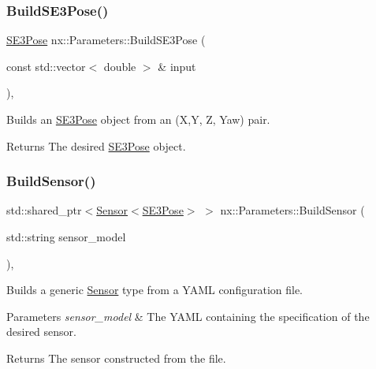 \subsubsection{\texorpdfstring{Build\+S\+E3\+Pose()}{BuildSE3Pose()}}
{\footnotesize\ttfamily \hyperlink{structnx_1_1SE3Pose}{S\+E3\+Pose} nx\+::\+Parameters\+::\+Build\+S\+E3\+Pose (\begin{DoxyParamCaption}\item[{const std\+::vector$<$ double $>$ \&}]{input }\end{DoxyParamCaption})\hspace{0.3cm}{\ttfamily [inline]}, {\ttfamily [protected]}}

Builds an \hyperlink{structnx_1_1SE3Pose}{S\+E3\+Pose} object from an (X,Y, Z, Yaw) pair. \begin{DoxyReturn}{Returns}
The desired \hyperlink{structnx_1_1SE3Pose}{S\+E3\+Pose} object. 
\end{DoxyReturn}
\mbox{\label{classnx_1_1Parameters_a60075d8f0a4b34c7f60e7cf0992ed413}} 
\subsubsection{\texorpdfstring{Build\+Sensor()}{BuildSensor()}}
{\footnotesize\ttfamily std\+::shared\+\_\+ptr$<$\hyperlink{classnx_1_1Sensor}{Sensor}$<$\hyperlink{structnx_1_1SE3Pose}{S\+E3\+Pose}$>$ $>$ nx\+::\+Parameters\+::\+Build\+Sensor (\begin{DoxyParamCaption}\item[{std\+::string}]{sensor\+\_\+model }\end{DoxyParamCaption})\hspace{0.3cm}{\ttfamily [inline]}, {\ttfamily [protected]}}

Builds a generic \hyperlink{classnx_1_1Sensor}{Sensor} type from a Y\+A\+ML configuration file. 
\begin{DoxyParams}{Parameters}
{\em sensor\+\_\+model} & The Y\+A\+ML containing the specification of the desired sensor. \\
\hline
\end{DoxyParams}
\begin{DoxyReturn}{Returns}
The sensor constructed from the file. 
\end{DoxyReturn}
\mbox{\label{classnx_1_1Parameters_a7db487d62b8cbcc1ecda0ef1a8356d6a}} 
